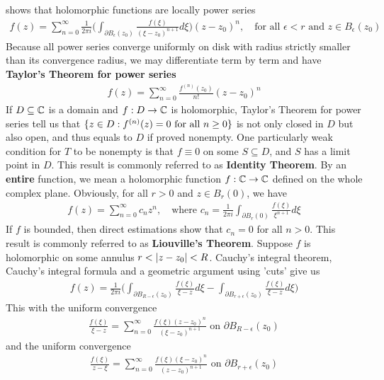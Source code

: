 \documentclass{report}
\begin{document}
shows that holomorphic functions are locally power series 
\begin{align*}
f(z)= \sum_{n=0}^{\infty} \frac{1}{2\pi i}\Big(\int_{\partial B_\epsilon (z_0)} \frac{f(\xi)}{(\xi- z_0)^{n+1}}d\xi \Big) (z-z_0)^{n},\quad\text{for all }\epsilon <r \text{ and }z\in B_\epsilon (z_0)
\end{align*}
Because all power series converge uniformly on disk with radius strictly smaller than its convergence radius, we may differentiate term by term and have \textbf{Taylor's Theorem for power series} 
\begin{align*}
f(z)= \sum_{n=0}^{\infty} \frac{f^{(n)}(z_0)}{n!}(z-z_0)^n
\end{align*}
If $D\subseteq \mathbb{C}$ is a domain and $f:D\rightarrow \mathbb{C}$ is holomorphic, Taylor's Theorem for power series tell us that $\{ z\in D: f^{(n)}(z)=0\text{ for all }n\geq 0 \}$ is not only closed in $D$ but also open, and thus equals to $D$ if proved nonempty. One particularly weak condition for $T$ to be nonempty  is that $f\equiv 0$ on some $S \subseteq D$, and $S$ has a limit point in  $D$. This result is commonly referred to as \textbf{Identity Theorem}. By an \textbf{entire} function, we mean a holomorphic function $f:\mathbb{C}\rightarrow \mathbb{C}$ defined on the whole complex plane. Obviously, for all $r>0$ and $z \in B_r(0)$, we have 
\begin{align*}
f(z)= \sum_{n=0}^{\infty}c_nz^n,\quad\text{where }c_n=\frac{1}{2\pi i} \int_{\partial B_r(0)} \frac{f(\xi)}{\xi^{n+1}}d\xi
\end{align*}
If $f$ is bounded, then direct estimations show that $c_n=0$ for all $n>0$. This result is commonly referred to as \textbf{Liouville's Theorem}. Suppose $f$ is holomorphic on some annulus $r<\left|z-z_0\right|<R$. Cauchy's integral theorem, Cauchy's integral formula and a geometric argument using 'cuts' give us 
\begin{align*}
f(z)= \frac{1}{2\pi  i} \Big(\int_{\partial B_{R- \epsilon }(z_0)} \frac{f(\xi)}{\xi - z}d\xi - \int_{\partial B_{r+\epsilon }(z_0)} \frac{f(\xi)}{\xi -z}d\xi  \Big)
\end{align*}
This with the uniform convergence
\begin{align*}
\frac{f(\xi)}{\xi -z} = \sum_{n=0}^{\infty} \frac{f(\xi) (z-z_0)^n }{(\xi -z_0)^{n+1}}\text{ on }\partial B_{R-\epsilon } (z_0)
\end{align*}
and the uniform convergence 
\begin{align*}
\frac{f(\xi)}{z-\xi}= \sum_{n=0}^{\infty} \frac{f(\xi)(\xi-z_0)^n}{(z-z_0)^{n+1}}\text{ on }\partial B_{r+\epsilon }(z_0)
\end{align*}
\end{document}
